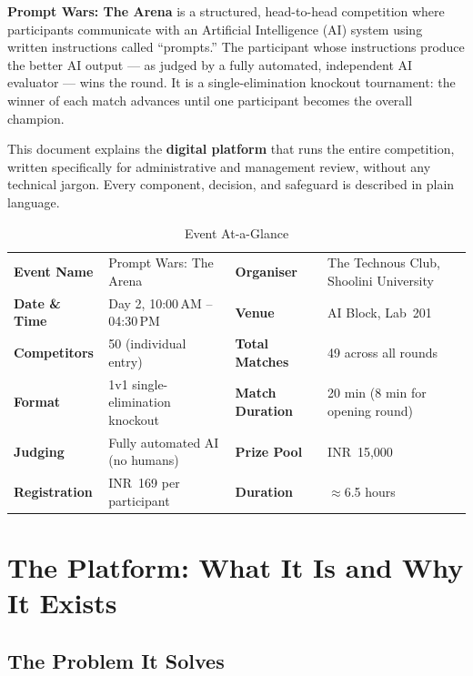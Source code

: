 \documentclass[11pt, a4paper]{article}
\begin{document}
\begin{tcolorbox}[keybox, title={What Is Prompt Wars?}]
\textbf{Prompt Wars: The Arena} is a structured, head-to-head competition where participants communicate with an Artificial Intelligence (AI) system using written instructions called ``prompts.'' The participant whose instructions produce the better AI output --- as judged by a fully automated, independent AI evaluator --- wins the round. It is a single-elimination knockout tournament: the winner of each match advances until one participant becomes the overall champion.
\end{tcolorbox}

This document explains the \textbf{digital platform} that runs the entire competition, written specifically for administrative and management review, without any technical jargon. Every component, decision, and safeguard is described in plain language.

\begin{table}[H]
\centering
\renewcommand{\arraystretch}{1.3}
\begin{tabularx}{\textwidth}{>{\bfseries}l X >{\bfseries}l X}
\toprule
Event Name     & Prompt Wars: The Arena          & Organiser       & The Technous Club, Shoolini University \\
Date \& Time   & Day 2, 10:00\,AM -- 04:30\,PM   & Venue           & AI Block, Lab~201 \\
Competitors    & 50 (individual entry)           & Total Matches   & 49 across all rounds \\
Format         & 1v1 single-elimination knockout & Match Duration  & 20 min (8 min for opening round) \\
Judging        & Fully automated AI (no humans)  & Prize Pool      & INR~15,000 \\
Registration   & INR~169 per participant         & Duration        & $\approx$6.5 hours \\
\bottomrule
\end{tabularx}
\caption{Event At-a-Glance}
\end{table}

\section{The Platform: What It Is and Why It Exists}

\subsection{The Problem It Solves}
\end{document}

